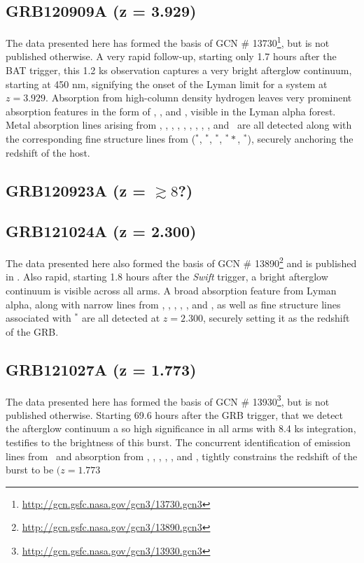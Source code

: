 \documentclass{aa}    %
\begin{document}
\subsection{GRB120909A (z = 3.929)}
The data presented here has formed the basis of GCN \#
13730\footnote{\url{http://gcn.gsfc.nasa.gov/gcn3/13730.gcn3}}, but is not
published otherwise. A very rapid follow-up, starting only 1.7 hours after the
BAT trigger, this 1.2 ks observation captures a very bright afterglow
continuum, starting at 450 nm, signifying the onset of the Lyman limit for a 
system at $z = 3.929$. Absorption from high-column density hydrogen leaves very
prominent absorption features in the form of \lya, \lyb, and \lyg, visible in
the Lyman alpha forest. Metal absorption lines arising from \feii, \NIii,
\SIii, \sii, \alii, \aliii, \cii, \oi, \civ, and \znii~are all detected along
with the corresponding fine structure lines from (\feii$^*$, \SIii$^*$,
\oi$^*$, \oi$^**$, \cii$^*$), securely anchoring the redshift of the host.




\subsection{GRB120923A (z = $\gtrsim8$?)}






\subsection{GRB121024A (z = 2.300)}
The data presented here also formed the basis of GCN \#
13890\footnote{\url{http://gcn.gsfc.nasa.gov/gcn3/13890.gcn3}} and is published
in \citet{Friis2015}. Also rapid, starting 1.8 hours after the \textit{Swift}
trigger, a bright afterglow continuum is visible across all arms. A broad
absorption feature from Lyman alpha, along with narrow lines from \civ, \SIii,
\SIiv, \feii, \sii, and \alii, as well as fine structure lines associated with
\SIii$^*$ are all detected at $z = 2.300$, securely setting it as the redshift
of the GRB.

\subsection{GRB121027A (z = 1.773)}		
The data presented here has formed the basis of GCN \#
13930\footnote{\url{http://gcn.gsfc.nasa.gov/gcn3/13930.gcn3}}, but is not
published otherwise. Starting 69.6 hours after the GRB trigger, that we detect
the afterglow continuum a so high significance in all arms with 8.4 ks
integration, testifies to the brightness of this burst. The concurrent
identification of emission lines from \oiii~and absorption from \civ, \alii,
\aliii, \mgi, \mgii, and \feii, tightly constrains the redshift of the burst to
be $(z = 1.773$
\end{document}
